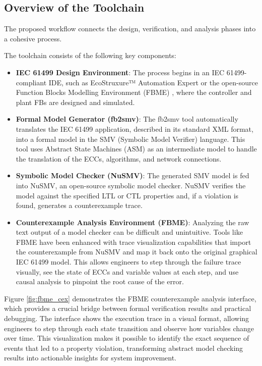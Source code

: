 \subsection{Overview of the Toolchain}

The proposed workflow connects the design, verification, and analysis phases into a cohesive process.

The toolchain consists of the following key components:

\begin{itemize}
\item \textbf{IEC 61499 Design Environment}: The process begins in an IEC 61499-compliant IDE, such as EcoStruxure™ Automation Expert or the open-source Function Blocks Modelling Environment (FBME) , where the controller and plant FBs are designed and simulated.

\item \textbf{Formal Model Generator (fb2smv)}: The fb2smv tool automatically translates the IEC 61499 application, described in its standard XML format, into a formal model in the SMV (Symbolic Model Verifier) language. This tool uses Abstract State Machines (ASM) as an intermediate model to handle the translation of the ECCs, algorithms, and network connections.

\item \textbf{Symbolic Model Checker (NuSMV)}: The generated SMV model is fed into NuSMV, an open-source symbolic model checker. NuSMV verifies the model against the specified LTL or CTL properties and, if a violation is found, generates a counterexample trace.

\item \textbf{Counterexample Analysis Environment (FBME)}: Analyzing the raw text output of a model checker can be difficult and unintuitive. Tools like FBME have been enhanced with trace visualization capabilities that import the counterexample from NuSMV and map it back onto the original graphical IEC 61499 model. This allows engineers to step through the failure trace visually, see the state of ECCs and variable values at each step, and use causal analysis to pinpoint the root cause of the error.
\end{itemize}

Figure \ref{fig:fbme_cex} demonstrates the FBME counterexample analysis interface, which provides a crucial bridge between formal verification results and practical debugging. The interface shows the execution trace in a visual format, allowing engineers to step through each state transition and observe how variables change over time. This visualization makes it possible to identify the exact sequence of events that led to a property violation, transforming abstract model checking results into actionable insights for system improvement.

